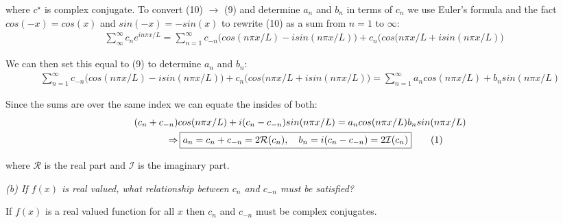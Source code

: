 \documentclass[10pt]{article}
\newcommand\numberthis{\addtocounter{equation}{1}\tag{\theequation}}
\newenvironment{proposition}[2][Proposition]{\begin{trivlist}
\item[\hskip \labelsep {\bfseries #1}\hskip \labelsep {\bfseries #2.}]}{\end{trivlist}}
\theoremstyle{remark}
\begin{document}
where $c^\star$ is complex conjugate. To convert (10) $\rightarrow$ (9) and determine $a_n$ and $b_n$ in terms of $c_n$ we use Euler's formula and the fact $cos(-x) = cos(x)$ and $sin(-x) = -sin(x)$ to rewrite (10) as a sum from $n = 1$ to $\infty$:
\begin{align*}
	& \sum\limits_\infty^\infty c_n e^{in\pi x/L} = \sum\limits_{n=1}^\infty c_{-n}\bigg(cos(n\pi x/L) - isin(n\pi x/L)\bigg) + c_n\bigg(cos(n\pi x/L + isin(n\pi x/L)\bigg)
\end{align*}

We can then set this equal to (9) to determine $a_n$ and $b_n$:
\begin{align*}
 \sum\limits_{n=1}^\infty c_{-n}\bigg(cos(n\pi x/L) - isin(n\pi x/L)\bigg) + c_n\bigg(cos(n\pi x/L + isin(n\pi x/L)\bigg) = \sum\limits_{n=1}^\infty a_n cos(n\pi x/L) + b_n sin(n\pi x/L) 
\end{align*}

Since the sums are over the same index we can equate the insides of both:
\begin{align*}
	 (c_n + c_{-n})&cos(n\pi x/L) + i(c_n - c_{-n})sin(n\pi x/L) = a_ncos(n\pi x/L) b_nsin(n\pi x/L) \\
	 \Rightarrow & \, \boxed{a_n = c_n + c_{-n} = 2\mathcal{R}(c_n), \quad b_n = i(c_n - c_{-n}) = 2\mathcal{I}(c_n)} \numberthis
\end{align*}

where $\mathcal{R}$ is the real part and $\mathcal{I}$ is the imaginary part.

\newpage

\textit{(b) If $f(x)$ is real valued, what relationship between $c_n$ and $c_{-n}$ must be satisfied?}

\begin{proposition}{1}
If $f(x)$ is a real valued function for all $x$ then $c_n$ and $c_{-n}$ must be complex conjugates.
\end{proposition}
\end{document}
